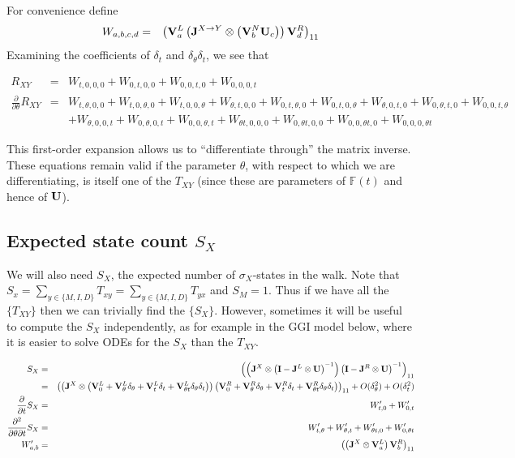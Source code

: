 \documentclass{article}
\begin{document}
For convenience define
\begin{eqnarray*}
W_{a,b,c,d} & = &
\left( {\bf V}^L_a \left( {\bf J}^{X \to Y} \otimes \left( {\bf V}^N_b {\bf U}_c \right) \right) {\bf V}^R_d \right)_{11}
\end{eqnarray*}
Examining the coefficients of $\delta_t$ and $\delta_\theta \delta_t$, we see that

\begin{eqnarray*}
  R_{XY} & = &
  W_{t,0,0,0} + W_{0,t,0,0} + W_{0,0,t,0} + W_{0,0,0,t}
  \\
  \frac{\partial}{\partial \theta}R_{XY} & = &
  W_{t,\theta,0,0} + W_{t,0,\theta,0} + W_{t,0,0,\theta}
  + W_{\theta,t,0,0} + W_{0,t,\theta,0} + W_{0,t,0,\theta}
  + W_{\theta,0,t,0} + W_{0,\theta,t,0} + W_{0,0,t,\theta}
  \\ & &
  + W_{\theta,0,0,t} + W_{0,\theta,0,t} + W_{0,0,\theta,t}
  + W_{\theta t,0,0,0} + W_{0,\theta t,0,0} + W_{0,0,\theta t,0} + W_{0,0,0,\theta t}
\end{eqnarray*}

This first-order expansion allows us to ``differentiate through'' the matrix inverse.
These equations remain valid if the parameter $\theta$, with respect to which we are differentiating, is itself one of the $T_{XY}$
(since these are parameters of $\mathbb{F}(t)$ and hence of ${\bf U}$).

\subsection{Expected state count $S_X$}

We will also need $S_X$, the expected number of $\sigma_X$-states in the walk.
Note that $S_x = \sum_{y \in \{M,I,D\}} T_{xy}  = \sum_{y \in \{M,I,D\}} T_{yx}$
and $S_M = 1$.
Thus if we have all the $\{ T_{XY} \}$ then we can trivially find the $\{ S_X \}$.
However, sometimes it will be useful to compute the $S_X$ independently,
as for example in the GGI model below, where it is easier to solve ODEs for the $S_X$ than the $T_{XY}$.

\begin{eqnarray*}
S_X & = &
\left(
     \left(
          {\bf J}^X \otimes
          \left( {\bf I} - {\bf J}^L \otimes {\bf U} \right)^{-1}
     \right)
\left( {\bf I} - {\bf J}^R \otimes {\bf U} \right)^{-1}
\right)_{11}
\\
& = &
\left(
     \left(
          {\bf J}^X \otimes
          \left( {\bf V}_0^{L} + {\bf V}_\theta^{L} \delta_\theta + {\bf V}_t^{L} \delta_t + {\bf V}_{\theta t}^{L} \delta_\theta \delta_t \right)
     \right)
\left( {\bf V}_0^{R} + {\bf V}_\theta^{R} \delta_\theta + {\bf V}_t^{R} \delta_t + {\bf V}_{\theta t}^{R} \delta_\theta \delta_t \right)
\right)_{11}  + O(\delta_\theta^2) + O(\delta_t^2)
  \\
  \frac{\partial}{\partial t} S_X & = &
  W'_{t,0} + W'_{0,t}
  \\
  \frac{\partial^2}{\partial \theta \partial t} S_X & = &
  W'_{t,\theta} + W'_{\theta,t}
  + W'_{\theta t,0} + W'_{0,\theta t}
\\
W'_{a,b} & = &
\left( \left( {\bf J}^X \otimes {\bf V}^L_a \right) {\bf V}^R_b \right)_{11}
\end{eqnarray*}
\end{document}
